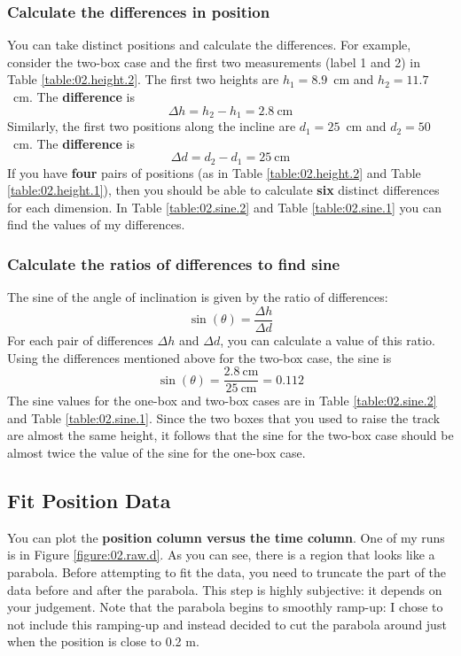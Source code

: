 \subsubsection{Calculate the differences in position}
%
You can take distinct positions and calculate the differences. For example, consider the two-box case and the first two measurements (label 1 and 2) in Table \ref{table:02.height.2}. The first two heights are $h_{1} = 8.9$~cm and $h_{2} = 11.7$~cm. The \textbf{difference} is
\begin{equation}
    \Delta h = h_{2} - h_{1} = 2.8 \ \text{cm}
\end{equation}
Similarly, the first two positions along the incline are $d_{1} = 25$~cm and $d_{2} = 50$~cm. The \textbf{difference} is
\begin{equation}
    \Delta d = d_{2} - d_{1} = 25 \ \text{cm}
\end{equation}
If you have \textbf{four} pairs of positions (as in Table \ref{table:02.height.2} and Table \ref{table:02.height.1}), then you should be able to calculate \textbf{six} distinct differences for each dimension. In Table \ref{table:02.sine.2} and Table \ref{table:02.sine.1} you can find the values of my differences.
%
\subsubsection{Calculate the ratios of differences to find sine}
%
The sine of the angle of inclination is given by the ratio of differences:
\begin{equation}
    \sin(\theta) = \frac{\Delta h}{\Delta d}
\end{equation}
For each pair of differences $\Delta h$ and $\Delta d$, you can calculate a value of this ratio. Using the differences mentioned above for the two-box case, the sine is
\begin{equation}
    \sin(\theta) = \frac{2.8 \ \text{cm}}{25 \ \text{cm}} = 0.112
\end{equation}
The sine values for the one-box and two-box cases are in Table \ref{table:02.sine.2} and Table \ref{table:02.sine.1}. Since the two boxes that you used to raise the track are almost the same height, it follows that the sine for the two-box case should be almost twice the value of the sine for the one-box case.
%
\subsection{Fit Position Data}
%
You can plot the \textbf{position column versus the time column}. One of my runs is in Figure \ref{figure:02.raw.d}. As you can see, there is a region that looks like a parabola. Before attempting to fit the data, you need to truncate the part of the data before and after the parabola. This step is highly subjective: it depends on your judgement. Note that the parabola begins to smoothly ramp-up: I chose to not include this ramping-up and instead decided to cut the parabola around just when the position is close to 0.2 m.

